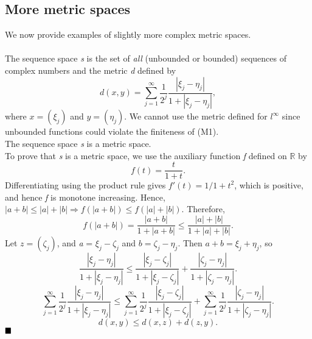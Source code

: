 \documentclass[11pt]{article}
\newcommand{\defn}[0]{\tcbhighmath[boxrule=0.5mm, colframe=cyan!20, colback=cyan!20, arc=10mm, size=fbox]{\mathrm{DEF:}}}
\newcommand{\thm}[0]{\tcbhighmath[boxrule=0.2mm, colframe=Melon, colback=Melon, arc=10mm, size=fbox]{\mathrm{Thm:}}}
\newcommand{\thmpf}[0]{\tcbhighmath[boxrule=0.5mm, colframe=Melon, colback=white, arc=10mm, size=fbox]{\mathrm{Proof:}}}
\begin{document}
\subsection{More metric spaces}
We now provide examples of slightly more complex metric spaces.
\\\\
\noindent
\defn{}
The sequence space \textit{s} is the set of \textit{all} (unbounded or bounded) sequences of complex numbers and the metric \textit{d} defined by
$$d(x, y) = \sum_{j=1}^\infty \frac{1}{2^j}\frac{|\xi_j - \eta_j|}{1 + |\xi_j - \eta_j|},$$
where $x = (\xi_j)$ and $y = (\eta_j)$. We cannot use the metric defined for $l^\infty$ since unbounded functions could violate the finiteness of (M1).
\\
\thm{} The sequence space \textit{s} is a metric space. 
\\\thmpf{}
To prove that \textit{s} is a metric space, we use the auxiliary function \textit{f} defined on $\mathbb{R}$ by
$$ f(t) = \frac{t}{1+t}.$$
Differentiating using the product rule gives $f'(t) = 1/{1+t}^2$, which is positive, and hence \textit{f} is monotone increasing. Hence, $|a + b| \leq |a| + |b| \Rightarrow f(|a+b|) \leq f(|a| + |b|).$ Therefore,
$$ f(|a + b|) = \frac{|a+b|}{1 + |a+b|} \leq \frac{|a| +|b|}{1 + |a| + |b|}.$$
Let $z = (\zeta_j)$, and \textit{a} = $\xi_j - \zeta_j$ and $\textit{b} = \zeta_j - \eta_j$. Then $a + b = \xi_j + \eta_j$, so 
$$\frac{|\xi_j - \eta_j|}{1 +|\xi_j - \eta_j|} \leq \frac{|\xi_j - \zeta_j|}{1+ |\xi_j - \zeta_j|} + \frac{|\zeta_j - \eta_j|}{1+|\zeta_j - \eta_j|}.$$
$$\sum_{j=1}^{\infty}\frac{1}{2^j}\frac{|\xi_j - \eta_j|}{1 +|\xi_j - \eta_j|} \leq \sum_{j=1}^{\infty}\frac{1}{2^j}\frac{|\xi_j - \zeta_j|}{1+ |\xi_j - \zeta_j|} + \sum_{j=1}^{\infty}\frac{1}{2^j}\frac{|\zeta_j - \eta_j|}{1+|\zeta_j - \eta_j|}.$$
$$d(x,y) \leq d(x, z) + d(z, y).$$ $\hfill \blacksquare$
\end{document}
